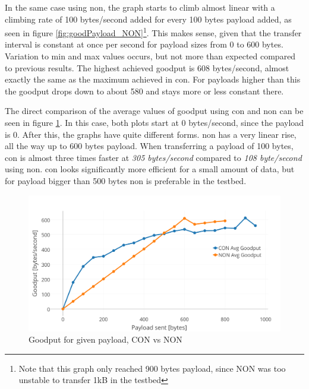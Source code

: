 \newpage
\noindent In the same case using \gls{non}, the graph starts to climb almost linear with a climbing rate of 100 bytes/second added for every 100 bytes \gls{payload} added, as seen in figure \ref{fig:goodPayload_NON}\footnote{Note that this graph only reached 900 bytes payload, since NON was too unstable to transfer 1kB in the testbed}. This makes sense, given that the transfer interval is constant at once per second for \gls{payload} sizes from 0 to 600 bytes. Variation to min and max values occurs, but not more than expected compared to previous results. The highest achieved \gls{goodput} is 608 bytes/second, almost exactly the same as the maximum achieved in \gls{con}. For \glspl{payload} higher than this the \gls{goodput} drops down to about 580 and stays more or less constant there. %


\noindent The direct comparison of the average values of \gls{goodput} using \gls{con} and \gls{non} can be seen in figure \ref{fig:payloadGoodput_CONNON}. In this case, both plots start at 0 bytes/second, since the payload is 0. After this, the graphs have quite different forms. \gls{non} has a very linear rise, all the way up to 600 bytes \gls{payload}. When transferring a payload of 100 bytes, \gls{con} is almost three times faster at \textit{305 bytes/second} compared to \textit{108 byte/second} using \gls{non}. \gls{con} looks significantly more efficient for a small amount of data, but for payload bigger than 500 bytes \gls{non} is preferable in the testbed.

\begin{figure}[ht]
    \centering
    \includegraphics[width=1.0\textwidth]{payloadGoodput_CONNON.png}    
    \caption{Goodput for given payload, CON vs NON}
    \label{fig:payloadGoodput_CONNON}
\end{figure}
 


